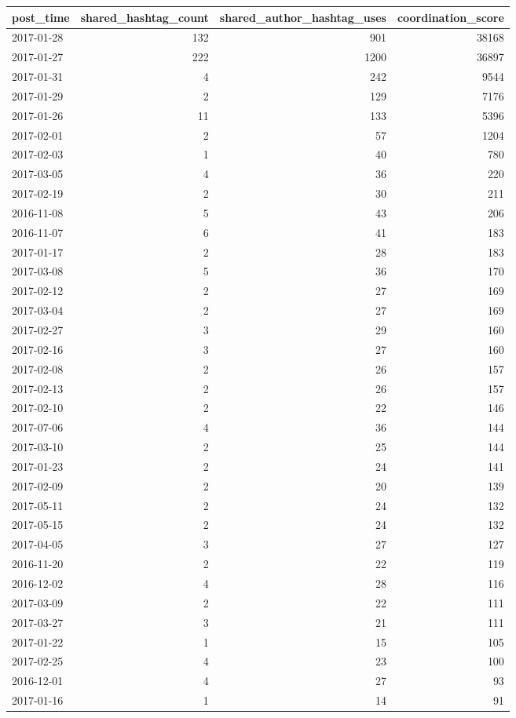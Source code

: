 \begin{tabular}{lrrr}
\toprule
post\_time & shared\_hashtag\_count & shared\_author\_hashtag\_uses & coordination\_score \\
\midrule
2017-01-28 & 132 & 901 & 38168 \\
2017-01-27 & 222 & 1200 & 36897 \\
2017-01-31 & 4 & 242 & 9544 \\
2017-01-29 & 2 & 129 & 7176 \\
2017-01-26 & 11 & 133 & 5396 \\
2017-02-01 & 2 & 57 & 1204 \\
2017-02-03 & 1 & 40 & 780 \\
2017-03-05 & 4 & 36 & 220 \\
2017-02-19 & 2 & 30 & 211 \\
2016-11-08 & 5 & 43 & 206 \\
2016-11-07 & 6 & 41 & 183 \\
2017-01-17 & 2 & 28 & 183 \\
2017-03-08 & 5 & 36 & 170 \\
2017-02-12 & 2 & 27 & 169 \\
2017-03-04 & 2 & 27 & 169 \\
2017-02-27 & 3 & 29 & 160 \\
2017-02-16 & 3 & 27 & 160 \\
2017-02-08 & 2 & 26 & 157 \\
2017-02-13 & 2 & 26 & 157 \\
2017-02-10 & 2 & 22 & 146 \\
2017-07-06 & 4 & 36 & 144 \\
2017-03-10 & 2 & 25 & 144 \\
2017-01-23 & 2 & 24 & 141 \\
2017-02-09 & 2 & 20 & 139 \\
2017-05-11 & 2 & 24 & 132 \\
2017-05-15 & 2 & 24 & 132 \\
2017-04-05 & 3 & 27 & 127 \\
2016-11-20 & 2 & 22 & 119 \\
2016-12-02 & 4 & 28 & 116 \\
2017-03-09 & 2 & 22 & 111 \\
2017-03-27 & 3 & 21 & 111 \\
2017-01-22 & 1 & 15 & 105 \\
2017-02-25 & 4 & 23 & 100 \\
2016-12-01 & 4 & 27 & 93 \\
2017-01-16 & 1 & 14 & 91 \\

\end{tabular}
